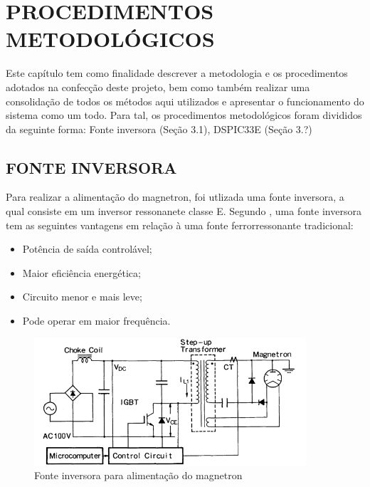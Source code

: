 \chapter{PROCEDIMENTOS METODOLÓGICOS}
\label{chap:metodologia}

Este capítulo tem como finalidade descrever a metodologia e os procedimentos adotados na confecção deste projeto, bem como também realizar uma consolidação de todos os métodos aqui utilizados e apresentar o funcionamento do sistema como um todo. Para tal, os procedimentos metodológicos foram divididos da seguinte forma: Fonte inversora (Seção 3.1), DSPIC33E  (Seção 3.?)

\section{FONTE INVERSORA}
\label{sec:fonteInversora}

Para realizar a alimentação do magnetron, foi utlizada uma fonte inversora, a qual consiste em um inversor ressonanete classe E. Segundo \cite{Hidenori1991}, uma fonte inversora tem as seguintes vantagens em relação à uma fonte ferrorressonante tradicional:
\begin{itemize}
    \item Potência de saída controlável;
    \item Maior eficiência energética;
    \item Circuito menor e mais leve;
    \item Pode operar em maior frequência.
\end{itemize} 

\begin{figure}[!htb]
    \centering
    \includegraphics[width=0.9\textwidth]{./dados/figuras/font_inverter}
    \caption{Fonte inversora para alimentação do magnetron}
    \label{fig:figura-inverter}
\end{figure}

